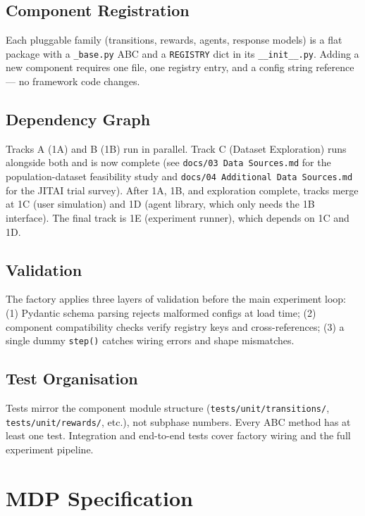 \documentclass[11pt,a4paper]{article}
\begin{document}
\subsection{Component Registration}

Each pluggable family (transitions, rewards, agents, response models) is a flat
package with a \texttt{\_base.py} ABC and a \texttt{REGISTRY} dict in its
\texttt{\_\_init\_\_.py}. Adding a new component requires one file, one registry
entry, and a config string reference --- no framework code changes.

\subsection{Dependency Graph}

Tracks A (1A) and B (1B) run in parallel. Track C (Dataset Exploration)
runs alongside both and is now complete (see \texttt{docs/03 Data Sources.md}
for the population-dataset feasibility study and \texttt{docs/04 Additional Data Sources.md}
for the JITAI trial survey).
After 1A, 1B, and exploration complete, tracks merge at
1C (user simulation) and 1D (agent library, which only needs the 1B interface).
The final track is 1E (experiment runner), which depends on 1C and 1D.

\subsection{Validation}

The factory applies three layers of validation before the main experiment loop:
(1) Pydantic schema parsing rejects malformed configs at load time; (2) component
compatibility checks verify registry keys and cross-references; (3) a single
dummy \texttt{step()} catches wiring errors and shape mismatches.

\subsection{Test Organisation}

Tests mirror the component module structure (\texttt{tests/unit/transitions/},
\texttt{tests/unit/rewards/}, etc.), not subphase numbers. Every ABC method has
at least one test. Integration and end-to-end tests cover factory wiring and the
full experiment pipeline.

\section{MDP Specification}
\end{document}

